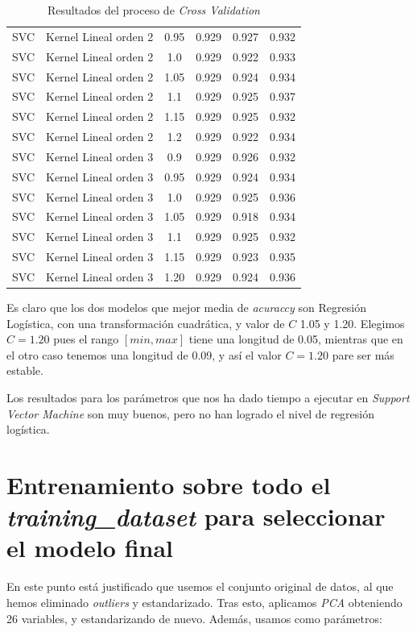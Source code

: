 \documentclass[11pt]{article}
\begin{document}
\begin{table}
\begin{tabular}{|c|c|c|c|c|c|}
    SVC & Kernel Lineal orden 2 & 0.95 & 0.929 & 0.927 & 0.932 \\
    SVC & Kernel Lineal orden 2 & 1.0 & 0.929 & 0.922 & 0.933 \\
    SVC & Kernel Lineal orden 2 & 1.05 & 0.929 & 0.924 & 0.934 \\
    SVC & Kernel Lineal orden 2 & 1.1 & 0.929 & 0.925 & 0.937 \\
    SVC & Kernel Lineal orden 2 & 1.15 & 0.929 & 0.925 & 0.932 \\
    SVC & Kernel Lineal orden 2 & 1.2 & 0.929 & 0.922 & 0.934 \\
    SVC & Kernel Lineal orden 3 & 0.9 & 0.929 & 0.926 & 0.932 \\
    SVC & Kernel Lineal orden 3 & 0.95 & 0.929 & 0.924 & 0.934 \\
    SVC & Kernel Lineal orden 3 & 1.0 & 0.929 & 0.925 & 0.936 \\
    SVC & Kernel Lineal orden 3 & 1.05 & 0.929 & 0.918 & 0.934 \\
    SVC & Kernel Lineal orden 3 & 1.1 & 0.929 & 0.925 & 0.932 \\
    SVC & Kernel Lineal orden 3 & 1.15 & 0.929 & 0.923 & 0.935 \\
    SVC & Kernel Lineal orden 3 & 1.20 & 0.929 & 0.924 & 0.936 \\
    \hline
\end{tabular}
    \caption{Resultados del proceso de \emph{Cross Validation}}
    \label{tabla_cv_clasif}
\end{table}

Es claro que los dos modelos que mejor media de \emph{acuraccy} son Regresión Logística, con una transformación cuadrática, y valor de $C$ 1.05 y 1.20. Elegimos $C = 1.20$ pues el rango $[min, max]$ tiene una longitud de 0.05, mientras que en el otro caso tenemos una longitud de 0.09, y así el valor $C=1.20$ pare ser más estable.

Los resultados para los parámetros que nos ha dado tiempo a ejecutar en \emph{Support Vector Machine} son muy buenos, pero no han logrado el nivel de regresión logística.

\pagebreak

\section{Entrenamiento sobre todo el \emph{training\_dataset} para seleccionar el modelo final}

En este punto está justificado que usemos el conjunto original de datos, al que hemos eliminado \emph{outliers} y estandarizado. Tras esto, aplicamos \emph{PCA} obteniendo 26 variables, y estandarizando de nuevo. Además, usamos como parámetros:
\end{document}
